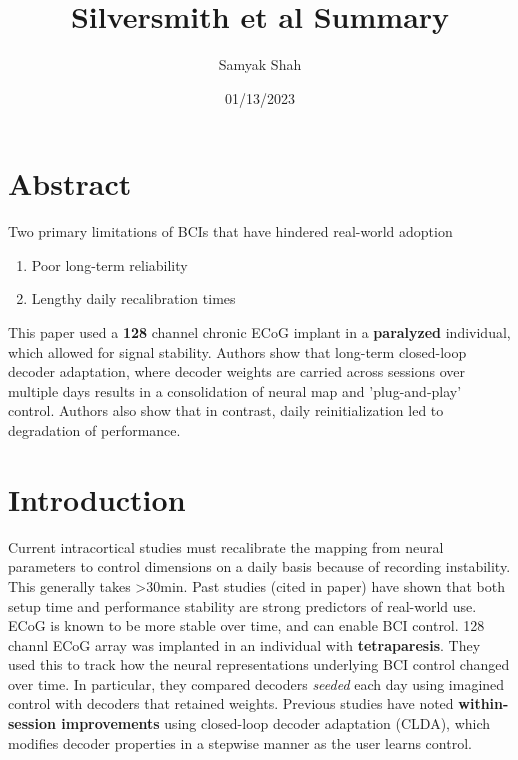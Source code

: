 \documentclass[11pt, a4paper, openany]{report}
\title{Silversmith et al Summary}
\author{Samyak Shah}
\date{01/13/2023}
\theoremstyle{definition}
\theoremstyle{remark}
\begin{document}
\maketitle

\section{Abstract}
Two primary limitations of BCIs that have hindered real-world adoption

\begin{enumerate}
    \item Poor long-term reliability
    \item Lengthy daily recalibration times
\end{enumerate}

This paper used a \textbf{128} channel chronic ECoG implant in a \textbf{paralyzed} individual, which allowed for signal stability.
Authors show that long-term closed-loop decoder adaptation, where decoder weights are carried across sessions over multiple days results in a consolidation of neural map and 'plug-and-play' control. Authors also show that in contrast, daily reinitialization led to degradation of performance.

\section{Introduction}
Current intracortical studies must recalibrate the mapping from neural parameters to control dimensions on a daily basis because of recording instability. This generally takes >30min. Past studies (cited in paper) have shown that both setup time and performance stability are strong predictors of real-world use.\\

ECoG is known to be more stable over time, and can enable BCI control. 128 channl ECoG array was implanted in an individual with \textbf{tetraparesis}. They used this to track how the neural representations underlying BCI control changed over time. In particular, they compared decoders \textit{seeded} each day using imagined control with decoders that retained weights. Previous studies have noted \textbf{within-session improvements} using closed-loop decoder adaptation (CLDA), which modifies decoder properties in a stepwise manner as the user learns control. \\
\end{document}
